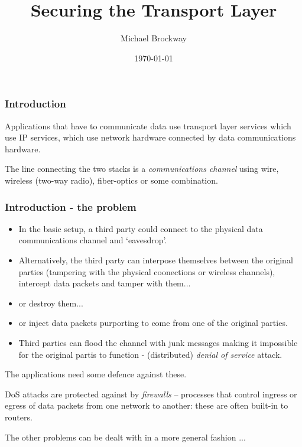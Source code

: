 \documentclass[10pt, hyperref={pdfpagelabels=false}]{beamer}
\title{Securing the Transport Layer}
\author{Michael Brockway}
\date{\today}
\begin{document}
\begin{frame}
\titlepage
\end{frame}

\begin{frame}
\frametitle{Introduction}
\begin{center}
\end{center}

Applications that have to communicate data use transport layer services which use IP services, which use network hardware connected by data communications hardware.

The line connecting the two stacks is a \emph{communications channel} using wire, wireless (two-way radio), fiber-optics or some combination.
\end{frame}

\begin{frame}
\frametitle{Introduction - the problem}
\begin{itemize}
\item In the basic setup, a third party could connect to the physical data communications channel and `eavesdrop'.
\item Alternatively, the third party can interpose themselves between the original parties (tampering with the physical coonections or wireless channels), intercept data packets and tamper with them...
\item or destroy them... 
\item or inject data packets purporting to come from one of the original parties. 
\item Third parties can flood the channel with junk messages making it impossible for the original partis to function - (distributed) \emph{denial of service} attack.
\end{itemize} 

The applications need some defence against these.

DoS attacks are protected against by \emph{firewalls} -- processes that control ingress or egress of data packets from one network to another: these are often built-in to routers.

The other problems can be dealt with in a more general fashion ...
\end{frame}
\end{document}
